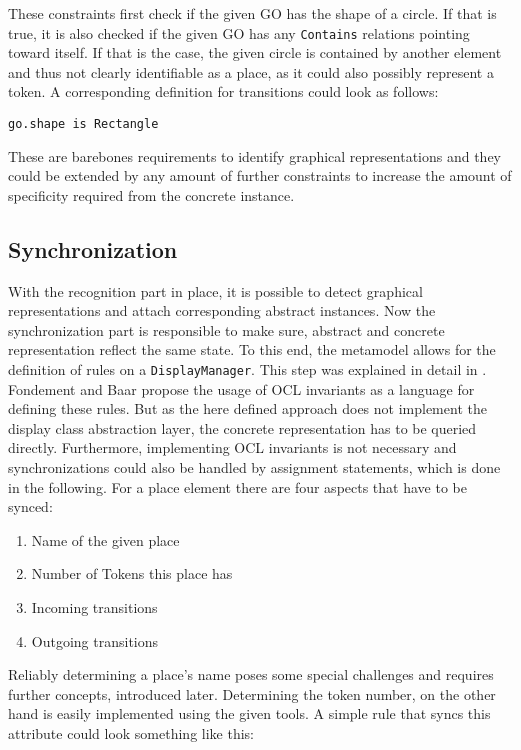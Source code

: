 These constraints first check if the given GO has the shape of a circle. If that is true, it is also checked if the given GO has any \texttt{Contains} relations pointing toward itself. If that is the case, the given circle is contained by another element and thus not clearly identifiable as a place, as it could also possibly represent a token. A corresponding definition for transitions could look as follows:

\begin{lstlisting}[captionpos=b,caption={Simple constraint to check for transition representations},label={lst:transition-constraints}]
go.shape is Rectangle
\end{lstlisting}

These are barebones requirements to identify graphical representations and they could be extended by any amount of further constraints to increase the amount of specificity required from the concrete instance.

\subsection{Synchronization}
With the recognition part in place, it is possible to detect graphical representations and attach corresponding abstract instances. Now the synchronization part is responsible to make sure, abstract and concrete representation reflect the same state. To this end, the metamodel allows for the definition of rules on a \texttt{DisplayManager}. This step was explained in detail in \cite{fondement_making_2005}. Fondement and Baar propose the usage of OCL invariants as a language for defining these rules. But as the here defined approach does not implement the display class abstraction layer, the concrete representation has to be queried directly. Furthermore, implementing OCL invariants is not necessary and synchronizations could also be handled by assignment statements, which is done in the following. For a place element there are four aspects that have to be synced:

\begin{enumerate}
  \item Name of the given place
  \item Number of Tokens this place has
  \item Incoming transitions
  \item Outgoing transitions
\end{enumerate}

Reliably determining a place's name poses some special challenges and requires further concepts, introduced later. Determining the token number, on the other hand is easily implemented using the given tools. A simple rule that syncs this attribute could look something like this:

